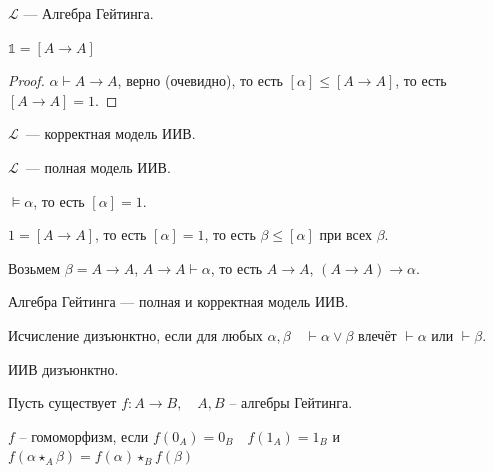 \begin{theorem}
    $\mathcal{L}$ --- Алгебра Гейтинга.
\end{theorem}

\begin{lemma}
    $\mathds{1} = [A \to A]$
\end{lemma}

\begin{proof}
    $\alpha \vdash A \to A$, верно (очевидно), то есть $[\alpha] \leqslant [A \to A]$, то есть $[A \to A] = 1$.
\end{proof}

\begin{theorem}
    $\mathcal{L}$~--- корректная модель ИИВ.
\end{theorem}

\begin{theorem}
    $\mathcal{L}$~--- полная модель ИИВ.

\end{theorem}

\begin{theorem}
    $\vDash \alpha$, то есть $[\alpha] = 1$.

    $1 = [A \to A]$, то есть $[\alpha] =1$, то есть $\beta \leqslant [\alpha]$ при всех $\beta$.

    Возьмем $\beta = A \to A$, $A \to A \vdash \alpha$, то есть $A \to A$, $(A \to A) \to \alpha$.

\end{theorem}

\begin{theorem}
    Алгебра Гейтинга --- полная и корректная модель ИИВ.
\end{theorem}

\begin{definition}
    Исчисление дизъюнктно, если для любых $\alpha, \beta\quad \vdash \alpha \lor \beta$ влечёт $\vdash \alpha$ или $\vdash \beta$.
\end{definition}

\begin{theorem}
    ИИВ дизъюнктно.
\end{theorem}

\begin{definition}
    Пусть существует $f: A \to B, \quad A, B$ -- алгебры Гейтинга.

    $f$ -- гомоморфизм, если $f(0_A) = 0_B\quad f(1_A) = 1_B$ и $f(\alpha \star_A \beta) = f(\alpha) \star_B f(\beta)$
\end{definition}

